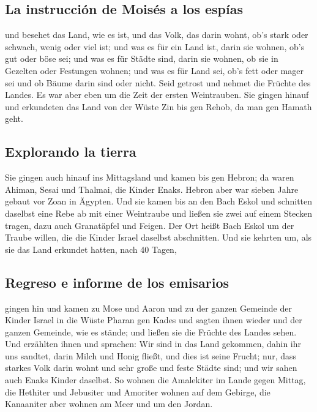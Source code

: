 \hypertarget{la-instrucciuxf3n-de-moisuxe9s-a-los-espuxedas}{%
\subsection{La instrucción de Moisés a los
espías}\label{la-instrucciuxf3n-de-moisuxe9s-a-los-espuxedas}}

 und besehet das Land, wie es ist, und das Volk, das
darin wohnt, ob's stark oder schwach, wenig oder viel ist;
 und was es für ein Land ist, darin sie wohnen, ob's gut
oder böse sei; und was es für Städte sind, darin sie wohnen, ob sie in
Gezelten oder Festungen wohnen;  und was es für Land sei,
ob's fett oder mager sei und ob Bäume darin sind oder nicht. Seid
getrost und nehmet die Früchte des Landes. Es war aber eben um die Zeit
der ersten Weintrauben.  Sie gingen hinauf und erkundeten
das Land von der Wüste Zin bis gen Rehob, da man gen Hamath geht.

\hypertarget{explorando-la-tierra}{%
\subsection{Explorando la tierra}\label{explorando-la-tierra}}

 Sie gingen auch hinauf ins Mittagsland und kamen bis gen
Hebron; da waren Ahiman, Sesai und Thalmai, die Kinder Enaks. Hebron
aber war sieben Jahre gebaut vor Zoan in Ägypten.  Und
sie kamen bis an den Bach Eskol und schnitten daselbst eine Rebe ab mit
einer Weintraube und ließen sie zwei auf einem Stecken tragen, dazu auch
Granatäpfel und Feigen.  Der Ort heißt Bach Eskol um der
Traube willen, die die Kinder Israel daselbst abschnitten.
 Und sie kehrten um, als sie das Land erkundet hatten,
nach 40 Tagen,

\hypertarget{regreso-e-informe-de-los-emisarios}{%
\subsection{Regreso e informe de los
emisarios}\label{regreso-e-informe-de-los-emisarios}}

 gingen hin und kamen zu Mose und Aaron und zu der ganzen
Gemeinde der Kinder Israel in die Wüste Pharan gen Kades und sagten
ihnen wieder und der ganzen Gemeinde, wie es stände; und ließen sie die
Früchte des Landes sehen.  Und erzählten ihnen und
sprachen: Wir sind in das Land gekommen, dahin ihr uns sandtet, darin
Milch und Honig fließt, und dies ist seine Frucht;  nur,
dass starkes Volk darin wohnt und sehr große und feste Städte sind; und
wir sahen auch Enaks Kinder daselbst.  So wohnen die
Amalekiter im Lande gegen Mittag, die Hethiter und Jebusiter und
Amoriter wohnen auf dem Gebirge, die Kanaaniter aber wohnen am Meer und
um den Jordan.

